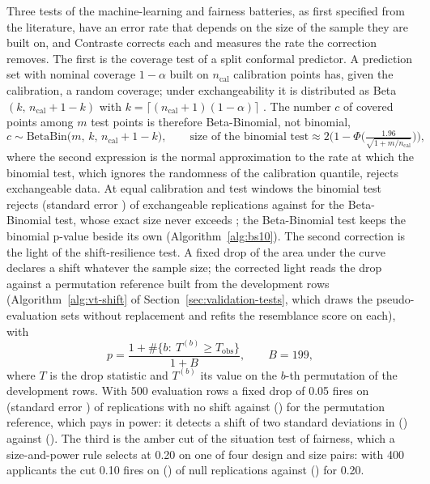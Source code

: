 Three tests of the machine-learning and fairness batteries, as first specified from the literature, have an error rate that depends on the size of the sample they are built on, and
Contraste corrects each and measures the rate the correction removes. The first is the coverage test of a split conformal predictor. A prediction set with nominal coverage $1-\alpha$ built
on $n_{\mathrm{cal}}$ calibration points has, given the calibration, a random coverage; under exchangeability it is distributed as Beta$(k,\,n_{\mathrm{cal}}+1-k)$ with
$k=\lceil (n_{\mathrm{cal}}+1)(1-\alpha)\rceil$ \citep{validation-tests:angelopoulos2021,validation-tests:vovk2022}. The number $c$ of covered points among $m$ test points is therefore Beta-Binomial, not binomial,
\begin{equation}
c\sim \mathrm{BetaBin}\big(m,\,k,\,n_{\mathrm{cal}}+1-k\big),\qquad
\text{size of the binomial test}\approx 2\Big(1-\Phi\Big(\tfrac{1.96}{\sqrt{1+m/n_{\mathrm{cal}}}}\Big)\Big),
\label{eq:bs10-betabin}
\end{equation}
where the second expression is the normal approximation to the rate at which the binomial test, which ignores the randomness of the calibration quantile, rejects exchangeable data. At equal
calibration and test windows the binomial test rejects \pxPpTenBinomEqual{} (standard error \pxPpTenBinomEqualSe{}) of exchangeable replications against \pxPpTenBetaBin{} for the Beta-Binomial test,
whose exact size never exceeds \pxPpTenBetaBinMax{}; the Beta-Binomial test keeps the binomial p-value beside its own (Algorithm~\ref{alg:bs10}). The second correction is the light of the shift-resilience test. A fixed drop of the area under the curve declares a shift whatever the sample size; the corrected light reads the
drop against a permutation reference built from the development rows (Algorithm~\ref{alg:vt-shift} of Section~\ref{sec:validation-tests}, which draws the pseudo-evaluation sets without replacement and refits the resemblance score on each), with
\begin{equation}
p=\frac{1+\#\{b:\ T^{(b)}\ge T_{\mathrm{obs}}\}}{1+B},\qquad B=199,
\label{eq:bs10-permutation}
\end{equation}
where $T$ is the drop statistic and $T^{(b)}$ its value on the $b$-th permutation of the development rows. With 500 evaluation rows a fixed drop of 0.05 fires on \pxPpTenFixedFive{} (standard error \pxPpTenFixedFiveSe{}) of replications
with no shift against \pxPpTenPerm{} (\pxPpTenPermSe{}) for the permutation reference, which pays in power: it detects a shift of two standard deviations in \pxPpTenPermPower{} (\pxPpTenPermPowerSe{}) against \pxPpTenFixedPower{} (\pxPpTenFixedPowerSe{}). The third is the amber cut of
the situation test of fairness, which a size-and-power rule selects at 0.20 on one of four design and size pairs: with 400 applicants the cut 0.10 fires on \pxPpTenCutTen{} (\pxPpTenCutTenSe{}) of null replications against
\pxPpTenCutTwenty{} (\pxPpTenCutTwentySe{}) for 0.20.

